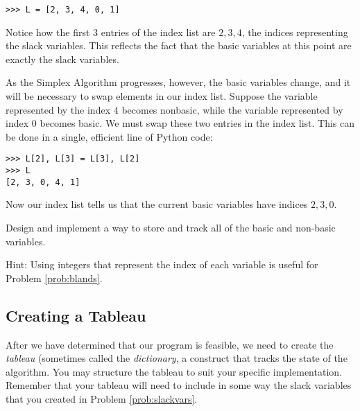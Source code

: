 \begin{lstlisting}
>>> L = [2, 3, 4, 0, 1]
\end{lstlisting}

Notice how the first $3$ entries of the index list are $2, 3, 4$, the indices representing the slack variables.
This reflects the fact that the basic variables at this point are exactly the slack variables.

As the Simplex Algorithm progresses, however, the basic variables change, and it will be necessary to swap
elements in our index list. Suppose the variable represented by the index $4$ becomes nonbasic, while
the variable represented by index $0$ becomes basic. We must swap these two entries in the index list.
This can be done in a single, efficient line of Python code:

\begin{lstlisting}
>>> L[2], L[3] = L[3], L[2]
>>> L
[2, 3, 0, 4, 1]
\end{lstlisting}

Now our index list tells us that the current basic variables have indices $2, 3, 0$.

\begin{problem}
Design and implement a way to store and track all of the basic and non-basic variables.

Hint: Using integers that represent the index of each variable is useful for Problem \ref{prob:blands}.
\label{prob:slackvars}
\end{problem}

\subsection*{Creating a Tableau} %

After we have determined that our program is feasible, we need to create the \emph{tableau} (sometimes called the \emph{dictionary}, a construct that tracks the state of the algorithm.
You may structure the tableau to suit your specific implementation.
Remember that your tableau will need to include in some way the slack variables that you created in Problem \ref{prob:slackvars}.

